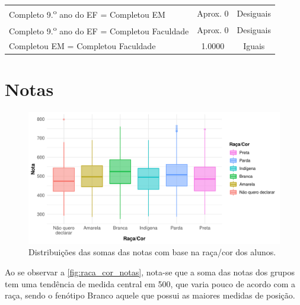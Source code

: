 \begin{table}[htb]
\begin{tabular}{lcc}
    Completo 9.\textsuperscript{o} ano do EF = Completou EM & Aprox. 0 & Desiguais\\
    Completo 9.\textsuperscript{o} ano do EF = Completou Faculdade & Aprox. 0 & Desiguais\\
    Completou EM = Completou Faculdade & 1.0000 & Iguais\\
    \bottomrule
    \end{tabular}
    \centering
\end{table}

\newpage
\section{Notas}


\begin{figure}[h]
    \caption{Distribuições das somas das notas com base na raça/cor dos alunos.\label{fig:raca_cor_notas}}
    \begin{center}
        \includegraphics[width=16cm]{img/raca_cor_notas.pdf}
    \end{center}
\end{figure}
Ao se observar a \autoref{fig:raca_cor_notas}, nota-se que a soma das notas dos grupos tem uma
tendência de medida central em 500, que varia pouco de acordo com a raça, sendo
o fenótipo Branco aquele que possui as maiores medidas de posição.

